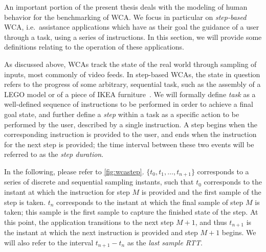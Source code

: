 An important portion of the present thesis deals with the modeling of human behavior for the benchmarking of \gls{WCA}.
We focus in particular on \emph{step-based} \gls{WCA}, i.e.\ assistance applications which have as their goal the guidance of a user through a task, using a series of instructions.
In this section, we will provide some definitions relating to the operation of these applications.

As discussed above, \glspl{WCA} track the state of the real world through sampling of inputs, most commonly of video feeds.
In step-based \glspl{WCA}, the state in question refers to the progress of some arbitrary, sequential task, such as the assembly of a LEGO model or of a piece of IKEA furniture~\cite{chen2018application}.
We will formally define \emph{task} as a well-defined sequence of instructions to be performed in order to achieve a final goal state, and further define a \emph{step} within a task as a specific action to be performed by the user, described by a single instruction.
A step begins when the corresponding instruction is provided to the user, and ends when the instruction for the next step is provided;
the time interval between these two events will be referred to as the \emph{step duration}.

In the following, please refer to \cref{fig:wcastep}.
\ensuremath{\{ t_0, t_1, \ldots, t_{n + 1} \}} corresponds to a series of discrete and sequential sampling instants, such that \ensuremath{t_0} corresponds to the instant at which the instruction for step \ensuremath{M} is provided and the first sample of the step is taken.
\ensuremath{t_n} corresponds to the instant at which the final sample of step \ensuremath{M} is taken;
this sample is the first sample to capture the finished state of the step.
At this point, the application transitions to the next step \ensuremath{M + 1}, and thus \ensuremath{t_{n + 1}} is the instant at which the next instruction is provided and step \ensuremath{M + 1} begins.
We will also refer to the interval \ensuremath{t_{n + 1} - t_n} as the \emph{last sample \gls{RTT}}.

